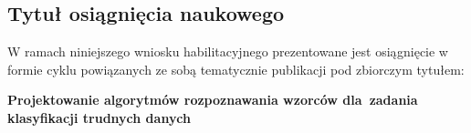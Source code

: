 \subsection{Tytuł osiągnięcia naukowego}
W ramach niniejszego wniosku habilitacyjnego prezentowane jest osiągnięcie w formie cyklu powiązanych ze sobą tematycznie publikacji pod zbiorczym tytułem:

\vspace{1em}
\begin{center}
	\LARGE
	\textbf{Projektowanie algorytmów rozpoznawania wzorców dla~zadania klasyfikacji trudnych danych}
\end{center}\vspace{1em}

